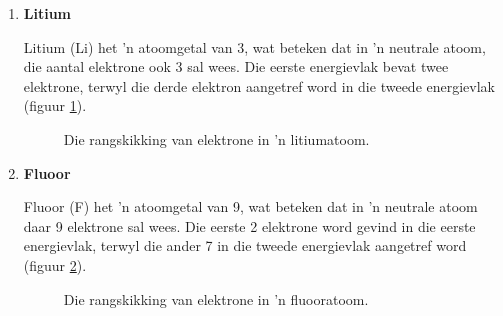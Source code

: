 \begin{enumerate}[noitemsep, label=\textbf{\arabic*}. ] 
\item{\textbf{Litium} \\
\begin{minipage}{.4\textwidth}
Litium (Li) het 'n atoomgetal van 3, wat beteken dat in 'n neutrale atoom, die aantal elektrone ook 3 sal wees. Die eerste energievlak bevat twee elektrone, terwyl die derde elektron aangetref word in die tweede energievlak (figuur \ref{fig:atom:lithium}).
\end{minipage}
\begin{minipage}{.6\textwidth}
\begin{figure}[H]
\begin{center}
\caption{Die rangskikking van elektrone in 'n litiumatoom.}
\label{fig:atom:lithium}
\end{center}
\end{figure}
\end{minipage}
}

\item{\textbf{Fluoor} \\
\begin{minipage}{.4\textwidth}
Fluoor (F) het 'n atoomgetal van 9, wat beteken dat in 'n neutrale atoom daar 9 elektrone sal wees. Die eerste 2 elektrone word gevind in die eerste energievlak, terwyl die ander 7 in die tweede energievlak aangetref word (figuur \ref{fig:atom:fluorine}).
\end{minipage}
\begin{minipage}{.6\textwidth}
\begin{figure}[H]
\begin{center}
\caption{Die rangskikking van elektrone in 'n fluooratoom.}
\label{fig:atom:fluorine}
\end{center}
\end{figure}
\end{minipage}
}


\end{enumerate}
